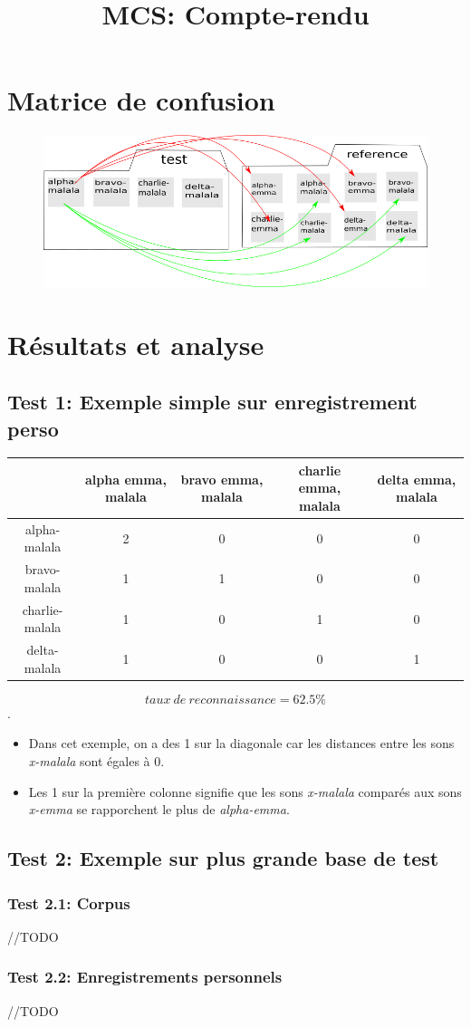 \documentclass{article}
\title{MCS: Compte-rendu}
\begin{document}
\maketitle
\section{Matrice de confusion}
	\begin{figure}[h]
		\includegraphics[scale=0.5]{compte-rendu.png}
	\end{figure}
\section{Résultats et analyse}
	\subsection{Test 1: Exemple simple sur enregistrement perso}
	\begin{table}[h]
		\begin{tabular}{|c|c|c|c|c|}
			\hline
			& alpha emma, malala & bravo emma, malala & charlie emma, malala & delta emma, malala\\
			\hline
			alpha-malala & 2 & 0 & 0 & 0 \\
			\hline
			bravo-malala & 1 & 1 & 0 & 0 \\
			\hline
			charlie-malala & 1 & 0 & 1 & 0 \\
			\hline
			delta-malala & 1 & 0 & 0 & 1 \\
			\hline
		\end{tabular}
	\end{table}
	\[
   	taux\ de\ reconnaissance = 62.5 \%
	\].
	\begin{itemize}
		\item Dans cet exemple, on a des 1 sur la diagonale car les distances entre les sons \textit{x-malala} sont égales à 0.\\
		\item Les 1 sur la première colonne signifie que les sons \textit{x-malala} comparés aux sons \textit{x-emma} se rapporchent le plus de \textit{alpha-emma}.
	\end{itemize}

	\subsection{Test 2: Exemple sur plus grande base de test}
		\subsubsection{Test 2.1: Corpus}
			//TODO
		\subsubsection{Test 2.2: Enregistrements personnels}
			//TODO
\end{document}
